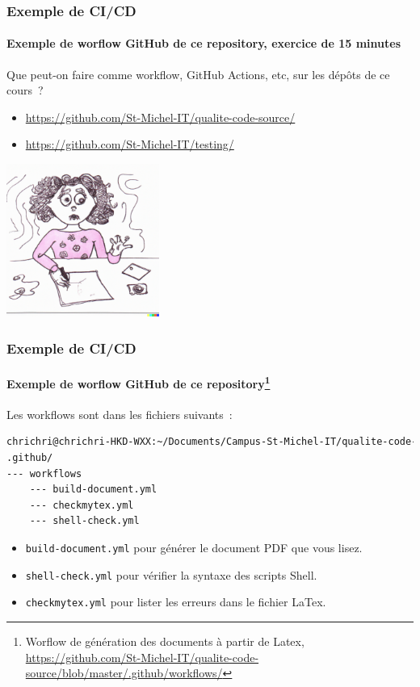 \documentclass{beamer}
\begin{document}
    \begin{frame}
        \frametitle{Exemple de CI/CD}
        \framesubtitle{Exemple de worflow GitHub de ce repository, exercice de 15 minutes}
        \transdissolve
        Que peut-on faire comme workflow, GitHub Actions, etc, sur les dépôts de ce cours~?
        \begin{itemize}
            \item \url{https://github.com/St-Michel-IT/qualite-code-source/}
            \item \url{https://github.com/St-Michel-IT/testing/}
        \end{itemize}
        \bigbreak
        \centering
        \includegraphics[width=5cm]{image/young-praticing-her-homework.png}
    \end{frame}

    \begin{frame}[fragile]
        \frametitle{Exemple de CI/CD}
        \framesubtitle{Exemple de worflow GitHub de ce repository{\footnote{Worflow de génération des documents à partir de Latex, \url{https://github.com/St-Michel-IT/qualite-code-source/blob/master/.github/workflows/}}}}
        \transdissolve
        Les workflows sont dans les fichiers suivants~:
        \begin{lstlisting}[language=sh]
chrichri@chrichri-HKD-WXX:~/Documents/Campus-St-Michel-IT/qualite-code-source$ tree .github/
.github/
--- workflows
    --- build-document.yml
    --- checkmytex.yml
    --- shell-check.yml
        \end{lstlisting}
        \begin{itemize}
            \item \lstinline{build-document.yml} pour générer le document PDF que vous lisez.
            \item \lstinline{shell-check.yml} pour vérifier la syntaxe des scripts Shell.
            \item \lstinline{checkmytex.yml} pour lister les erreurs dans le fichier LaTex.
        \end{itemize}
    \end{frame}
\end{document}
